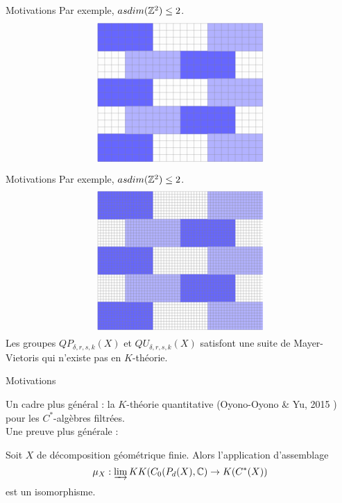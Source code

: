 \begin{frame}{Motivations}
Par exemple, $asdim(\mathbb Z^2) \leq 2$.
\[\begin{tikzpicture}

\draw[fill, blue!60] (0,0) rectangle (2,1) ; 
\draw[fill, blue!60] (0,2) rectangle (2,3) ; 
\draw[fill, blue!60] (0,4) rectangle (2,5) ; 
\draw[fill, blue!60] (3,1) rectangle (5,2) ;
\draw[fill, blue!60] (3,3) rectangle (5,4) ; 

\draw[fill, blue!30] (4,0) rectangle (6,1) ; 
\draw[fill, blue!30] (4,2) rectangle (6,3) ; 
\draw[fill, blue!30] (4,4) rectangle (6,5) ; 
\draw[fill, blue!30] (1,1) rectangle (3,2) ; 
\draw[fill, blue!30] (1,3) rectangle (3,4) ; 

\draw [very thin, gray] (0,0) grid[step=0.25] (6,5);
\end{tikzpicture}\]
\end{frame}

\begin{frame}{Motivations}
Par exemple, $asdim(\mathbb Z^2) \leq 2$.
\[\begin{tikzpicture}

\draw[fill, blue!60] (0,0) rectangle (2,1) ; 
\draw[fill, blue!60] (0,2) rectangle (2,3) ; 
\draw[fill, blue!60] (0,4) rectangle (2,5) ; 
\draw[fill, blue!60] (3,1) rectangle (5,2) ;
\draw[fill, blue!60] (3,3) rectangle (5,4) ; 

\draw[fill, blue!30] (4,0) rectangle (6,1) ; 
\draw[fill, blue!30] (4,2) rectangle (6,3) ; 
\draw[fill, blue!30] (4,4) rectangle (6,5) ; 
\draw[fill, blue!30] (1,1) rectangle (3,2) ; 
\draw[fill, blue!30] (1,3) rectangle (3,4) ; 

\draw [very thin, gray] (0,0) grid[step=0.1] (6,5);
\end{tikzpicture}\]
\pause
Les groupes $QP_{\delta, r ,s, k}(X)$ et $QU_{\delta, r ,s, k}(X)$ satisfont une suite de Mayer-Vietoris qui n'existe pas en $K$-théorie.
\end{frame}

\begin{frame}{Motivations}

Un cadre plus général : la $K$-théorie quantitative (Oyono-Oyono \& Yu, 2015 \cite{OY2}) pour les $C^*$-algèbres filtrées.\\
\vspace{0.3 cm}
Une preuve plus générale :

\begin{thmfr}
Soit $X$ de décomposition géométrique finie. Alors l'application d'assemblage
\[\mu_X : \varinjlim KK(C_0(P_d(X),\mathbb C) \rightarrow K(C^*(X))\]
est un isomorphisme.
\end{thmfr}

\end{frame}
